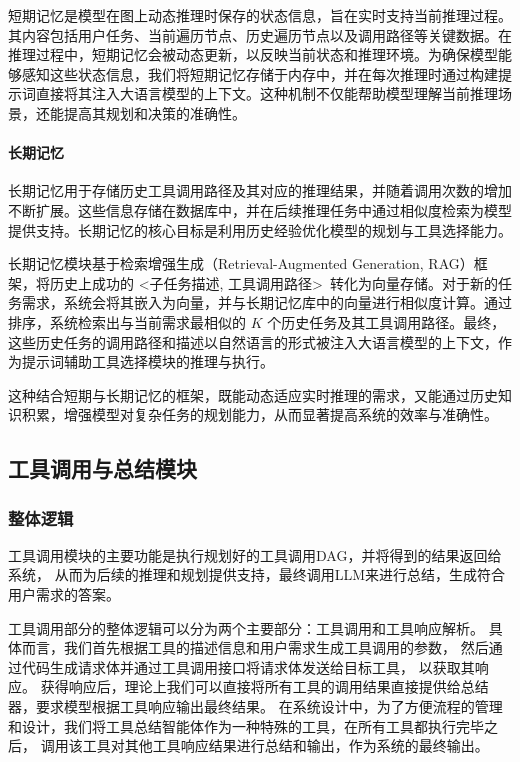 短期记忆是模型在图上动态推理时保存的状态信息，旨在实时支持当前推理过程。其内容包括用户任务、当前遍历节点、历史遍历节点以及调用路径等关键数据。在推理过程中，短期记忆会被动态更新，以反映当前状态和推理环境。为确保模型能够感知这些状态信息，我们将短期记忆存储于内存中，并在每次推理时通过构建提示词直接将其注入大语言模型的上下文。这种机制不仅能帮助模型理解当前推理场景，还能提高其规划和决策的准确性。

\paragraph{长期记忆}

长期记忆用于存储历史工具调用路径及其对应的推理结果，并随着调用次数的增加不断扩展。这些信息存储在数据库中，并在后续推理任务中通过相似度检索为模型提供支持。长期记忆的核心目标是利用历史经验优化模型的规划与工具选择能力。

长期记忆模块基于检索增强生成（Retrieval-Augmented Generation, RAG）框架，将历史上成功的 \textless 子任务描述, 工具调用路径\textgreater\ 转化为向量存储。对于新的任务需求，系统会将其嵌入为向量，并与长期记忆库中的向量进行相似度计算。通过排序，系统检索出与当前需求最相似的 \(K\) 个历史任务及其工具调用路径。最终，这些历史任务的调用路径和描述以自然语言的形式被注入大语言模型的上下文，作为提示词辅助工具选择模块的推理与执行。

这种结合短期与长期记忆的框架，既能动态适应实时推理的需求，又能通过历史知识积累，增强模型对复杂任务的规划能力，从而显著提高系统的效率与准确性。

\subsection{工具调用与总结模块}
\label{sec:real_tool_simulation}

\subsubsection{整体逻辑}

工具调用模块的主要功能是执行规划好的工具调用DAG，并将得到的结果返回给系统，
从而为后续的推理和规划提供支持，最终调用LLM来进行总结，生成符合用户需求的答案。

工具调用部分的整体逻辑可以分为两个主要部分：工具调用和工具响应解析。
具体而言，我们首先根据工具的描述信息和用户需求生成工具调用的参数，
然后通过代码生成请求体并通过工具调用接口将请求体发送给目标工具，
以获取其响应。
获得响应后，理论上我们可以直接将所有工具的调用结果直接提供给总结器，要求模型根据工具响应输出最终结果。
在系统设计中，为了方便流程的管理和设计，我们将工具总结智能体作为一种特殊的工具，在所有工具都执行完毕之后，
调用该工具对其他工具响应结果进行总结和输出，作为系统的最终输出。

